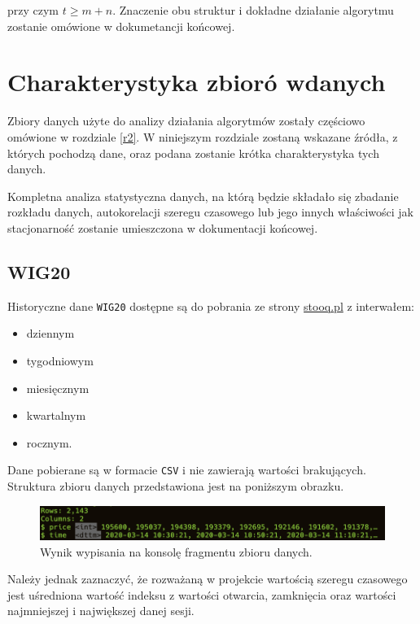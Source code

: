 \documentclass{article}
\begin{document}
przy czym $t \geq m+n$. Znaczenie obu struktur i dokładne działanie algorytmu zostanie omówione w dokumetancji końcowej.


\section{Charakterystyka zbioró wdanych \label{r5}}

Zbiory danych użyte do analizy działania algorytmów zostały częściowo
omówione w rozdziale \ref{r2}. W niniejszym rozdziale zostaną wskazane
źródła, z których pochodzą dane, oraz podana zostanie krótka
charakterystyka tych danych.

Kompletna analiza statystyczna danych, na którą będzie składało się
zbadanie rozkładu danych, autokorelacji szeregu czasowego lub jego
innych właściwości jak stacjonarność zostanie umieszczona w dokumentacji
końcowej.

\subsection{WIG20}

Historyczne dane \texttt{WIG20} dostępne są do pobrania ze strony
\href{https://stooq.pl/q/d/?s=wig20}{stooq.pl} z interwałem:

\begin{itemize}
\item
  dziennym
\item
  tygodniowym
\item
  miesięcznym
\item
  kwartalnym
\item
  rocznym.
\end{itemize}

Dane pobierane są w formacie \texttt{CSV} i nie zawierają wartości
brakujących. Struktura zbioru danych przedstawiona jest na poniższym
obrazku.

\begin{figure}[H]
  \centering
  \includegraphics[width=.75\textwidth]{./images/wt-glimpse.png}
  \caption{Wynik wypisania na konsolę fragmentu zbioru danych.}
\end{figure}

Należy jednak zaznaczyć, że rozważaną w projekcie wartością szeregu
czasowego jest uśredniona wartość indeksu z wartości otwarcia,
zamknięcia oraz wartości najmniejszej i największej danej sesji.
\end{document}
